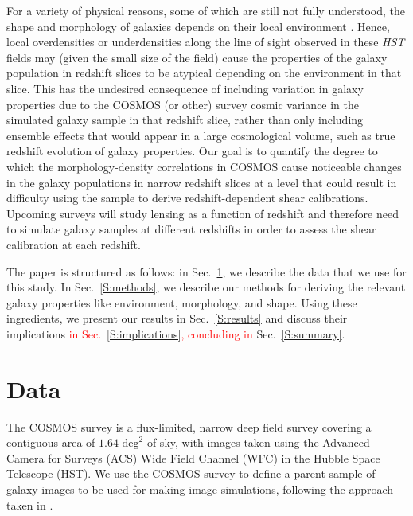 \documentclass[twocolumn,useAMS,usenatbib]{mn2e}
\newcommand{\rachel}[1]{{\textcolor{red}{#1}}}
\begin{document}
For a variety of physical reasons, some of which are still not fully
understood, the shape and morphology of
galaxies depends on their local environment
\citep[e.g.,][]{2014arXiv1402.1172C,2014MNRAS.444.2200D}. 
Hence, local overdensities or underdensities along the line of sight
observed in these {\em HST} fields may (given the small size of the field)
cause the properties of the galaxy population in redshift slices to be
atypical depending on the environment in that slice.  This has
the undesired consequence of including variation in galaxy properties
due to the COSMOS (or other) survey cosmic variance in the simulated galaxy sample in that redshift slice, rather than
only including ensemble effects that would appear in a large cosmological volume, such as true redshift evolution of
galaxy properties.  Our goal is to quantify the degree to which the
morphology-density correlations in COSMOS cause noticeable changes in
the galaxy populations in narrow redshift slices at a level that could
result in difficulty using the sample to derive redshift-dependent
shear calibrations.   Upcoming surveys will study lensing as a function of
redshift and therefore need to simulate galaxy samples at different
redshifts in order to assess the shear calibration at each redshift.

The paper is structured as follows: in Sec.~\ref{S:data}, we describe
the data that we use for this study.  In Sec.~\ref{S:methods}, we
describe our methods for deriving the relevant galaxy properties
like environment, morphology, and shape.  
Using these ingredients, we present our results in Sec.~\ref{S:results}
and discuss their implications \rachel{in Sec.~\ref{S:implications},
concluding in} Sec.~\ref{S:summary}.
\section{Data}
\label{S:data}
The COSMOS survey \citep{COSMOS_overview, COSMOS_generic, COSMOS_Alexie} is a flux-limited, narrow deep field survey covering a contiguous area of $1.64 \text{ deg}^2$ of sky, with images taken using the Advanced Camera for Surveys (ACS) Wide Field Channel (WFC)
in the Hubble Space Telescope (HST).  We use the COSMOS survey to
define a parent sample of galaxy images to be used for making image
simulations, following the approach taken in
\cite{2012MNRAS.420.1518M,great3}.
\end{document}
